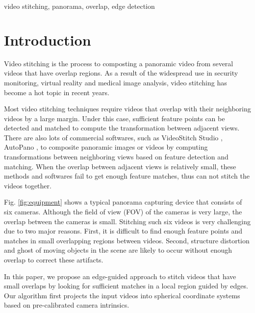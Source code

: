 \documentclass[conference]{IEEEtran}
\begin{document}
\begin{IEEEkeywords}
video stitching, panorama, overlap, edge detection
\end{IEEEkeywords}

\section{Introduction}
\label{sec:intro}

Video stitching is the process to composting a panoramic video from several videos that have overlap regions. %
As a result of the widespread
use in security monitoring, virtual reality and medical image
analysis, video stitching has become a hot topic in recent years.


Most video stitching techniques \cite{zheng2008stitching, guo2016joint, Jiang_2015_CVPR_Workshops, nie2018dynamic} require videos that overlap with
their neighboring videos by a large margin.
Under this case, sufficient feature points can be detected and matched to compute the transformation between adjacent views.
There are also lots of commercial softwares, such as VideoStitch Studio \cite{videostitching}, AutoPano \cite{autopano}, to composite panoramic images or videos by computing transformations between neighboring views based on feature detection and matching.
% 
When the overlap between adjacent views is relatively small, these methods and softwares fail to get enough feature matches, thus can not stitch the videos together.


Fig. \ref{fig:equipment} shows a typical panorama capturing device that consists of six cameras. 
Although the field of view (FOV) of the cameras is very large, the overlap between the cameras is small. 
Stitching such six videos is very challenging due to two
major reasons. First, it is difficult to find enough feature points and matches in small overlapping regions between videos. Second, structure distortion and ghost of moving objects in the scene are likely to occur without enough overlap to correct these artifacts. 



In this paper, we propose an edge-guided approach to stitch videos that have small overlaps by looking for sufficient matches in a local region guided by edges. 
%
Our algorithm first projects the input videos into spherical coordinate systems based on pre-calibrated camera intrinsics. 
\end{document}
